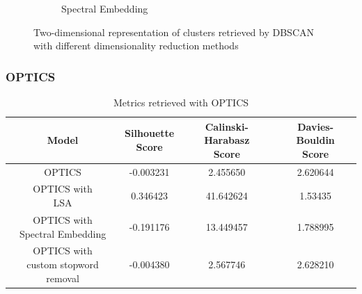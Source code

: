 \begin{figure}
\begin{subfigure}{.3\textwidth}
    \caption{Spectral Embedding}
    \label{fig:dbscan_spectral}
  \end{subfigure}
  \caption{Two-dimensional representation of clusters retrieved by DBSCAN with different dimensionality reduction methods}
  \label{fig:dbscan}
\end{figure}

\subsubsection{OPTICS}

\begin{table}[]
  \centering
  \begin{tabular}{c|c|c|c}
    Model &  \shortstack[c]{Silhouette \\ Score} & \shortstack[c]{Calinski-Harabasz \\ Score} &  \shortstack[c]{Davies-Bouldin \\ Score}  \\
    \hline
    \hline
    OPTICS & -0.003231 & 2.455650 & 2.620644 \\
    \hline
    \shortstack[c]{OPTICS with \\ LSA} & 0.346423 & 41.642624 & 1.53435 \\
    \hline
    \shortstack[c]{OPTICS with \\ Spectral Embedding} & -0.191176 & 13.449457 & 1.788995 \\
    \hline
    \shortstack[c]{OPTICS with \\ custom stopword removal} & -0.004380 & 2.567746 & 2.628210 \\
   \end{tabular}
  \caption{Metrics retrieved with OPTICS}
  \label{tab:scores_optics}
\end{table}

